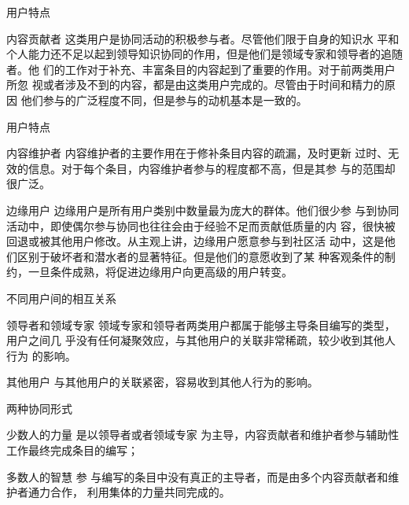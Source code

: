 \documentclass[slidestop,compress,mathserif,table]{beamer}
\begin{document}
 \begin{frame}{用户特点}
   \begin{block}{ 内容贡献者}
    这类用户是协同活动的积极参与者。尽管他们限于自身的知识水
  平和个人能力还不足以起到领导知识协同的作用，但是他们是领域专家和领导者的追随者。他
  们的工作对于补充、丰富条目的内容起到了重要的作用。对于前两类用户所忽
  视或者涉及不到的内容，都是由这类用户完成的。尽管由于时间和精力的原因
  他们参与的广泛程度不同，但是参与的动机基本是一致的。
   \end{block}
 \end{frame}

 \begin{frame}{用户特点}
   \begin{block}{ 内容维护者}
   内容维护者的主要作用在于修补条目内容的疏漏，及时更新
  过时、无效的信息。对于每个条目，内容维护者参与的程度都不高，但是其参
  与的范围却很广泛。
 \end{block}
 \begin{block}{ 边缘用户}
   边缘用户是所有用户类别中数量最为庞大的群体。他们很少参
  与到协同活动中，即使偶尔参与协同也往往会由于经验不足而贡献低质量的内
  容，很快被回退或被其他用户修改。从主观上讲，边缘用户愿意参与到社区活
  动中，这是他们区别于破坏者和潜水者的显著特征。但是他们的意愿收到了某
  种客观条件的制约，一旦条件成熟，将促进边缘用户向更高级的用户转变。
 \end{block}
 \end{frame}

 \begin{frame}{不同用户间的相互关系}
   \begin{block}{领导者和领域专家}
     领域专家和领导者两类用户都属于能够主导条目编写的类型，用户之间几
     乎没有任何凝聚效应，与其他用户的关联非常稀疏，较少收到其他人行为
     的影响。
   \end{block}
\vfill
   \begin{block}{其他用户}
     与其他用户的关联紧密，容易收到其他人行为的影响。
   \end{block}
 \end{frame}   
   \begin{frame}{两种协同形式}
     \begin{block}{少数人的力量}
       是以领导者或者领域专家
为主导，内容贡献者和维护者参与辅助性工作最终完成条目的编写；
     \end{block}
\vfill
     \begin{block}{多数人的智慧}
       参
与编写的条目中没有真正的主导者，而是由多个内容贡献者和维护者通力合作，
利用集体的力量共同完成的。
     \end{block}
   \end{frame}
\end{document}

